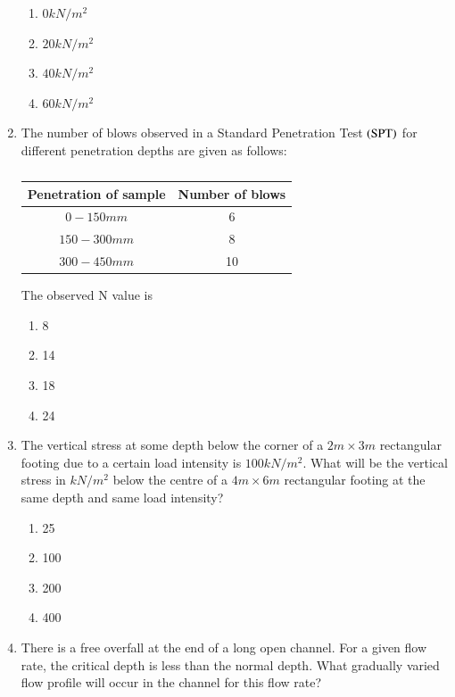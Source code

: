 \documentclass[journal,12pt,onecolumn]{IEEEtran}
\theoremstyle{remark}
\begin{document}
\begin{enumerate}
\hfill{}
\begin{enumerate}
\item $0kN/m^2$
\item $20kN/m^2$
\item $40kN/m^2$
\item $60kN/m^2$
\end{enumerate}

\item The number of blows observed in a Standard Penetration Test $\left(\text{SPT}\right)$ for different penetration depths are given as follows:

\hfill{}
\begin{table}[H]
\centering
\begin{tabular}{c|c}
Penetration of sample & Number of blows\\
\hline
$0-150mm$ & 6\\
\hline
$150-300mm$ & 8\\
\hline
$300-450mm$ & 10\\
\end{tabular}
\caption*{}
\label{tab:Q.9}
\end{table}
The observed N value is

\begin{enumerate}
\item 8
\item 14
\item 18
\item 24
\end{enumerate}

\item The vertical stress at some depth below the corner of a $2m\times3m$ rectangular footing due to a certain load intensity is $100 kN/m^2$. What will be the vertical stress in $kN/m^2$ below the centre of a $4m\times6m$ rectangular footing at the same depth and same load intensity?

\hfill{}
\begin{enumerate}
\item 25
\item 100
\item 200
\item 400
\end{enumerate}

\item There is a free overfall at the end of a long open channel. For a given flow rate, the critical depth is less than the normal depth. What gradually varied flow profile will occur in the channel for this flow rate?


\end{enumerate}
\end{document}
